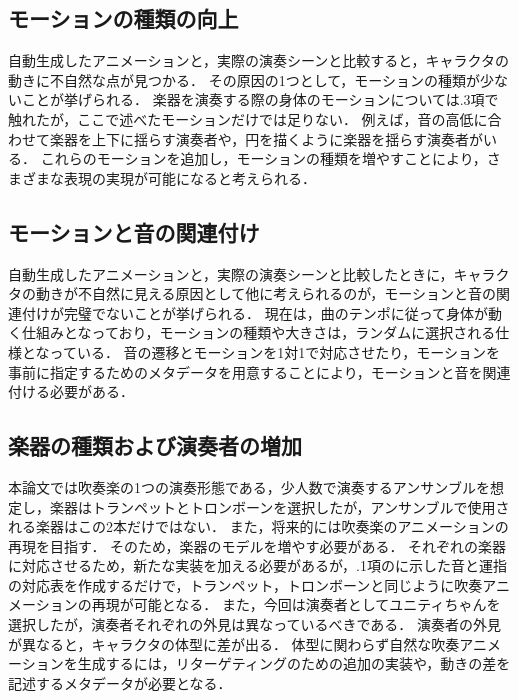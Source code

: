 \subsection{モーションの種類の向上}
自動生成したアニメーションと，実際の演奏シーンと比較すると，キャラクタの動きに不自然な点が見つかる．
その原因の1つとして，モーションの種類が少ないことが挙げられる．
楽器を演奏する際の身体のモーションについては{.3項}で触れたが，ここで述べたモーションだけでは足りない．
例えば，音の高低に合わせて楽器を上下に揺らす演奏者や，円を描くように楽器を揺らす演奏者がいる．
これらのモーションを追加し，モーションの種類を増やすことにより，さまざまな表現の実現が可能になると考えられる．

\subsection{モーションと音の関連付け}
自動生成したアニメーションと，実際の演奏シーンと比較したときに，キャラクタの動きが不自然に見える原因として他に考えられるのが，モーションと音の関連付けが完璧でないことが挙げられる．
現在は，曲のテンポに従って身体が動く仕組みとなっており，モーションの種類や大きさは，ランダムに選択される仕様となっている．
音の遷移とモーションを1対1で対応させたり，モーションを事前に指定するためのメタデータを用意することにより，モーションと音を関連付ける必要がある．

\subsection{楽器の種類および演奏者の増加}
本論文では吹奏楽の1つの演奏形態である，少人数で演奏するアンサンブルを想定し，楽器はトランペットとトロンボーンを選択したが，アンサンブルで使用される楽器はこの2本だけではない．
また，将来的には吹奏楽のアニメーションの再現を目指す．
そのため，楽器のモデルを増やす必要がある．
それぞれの楽器に対応させるため，新たな実装を加える必要があるが，{.1項}のに示した音と運指の対応表を作成するだけで，トランペット，トロンボーンと同じように吹奏アニメーションの再現が可能となる．
また，今回は演奏者としてユニティちゃんを選択したが，演奏者それぞれの外見は異なっているべきである．
演奏者の外見が異なると，キャラクタの体型に差が出る．
体型に関わらず自然な吹奏アニメーションを生成するには，リターゲティングのための追加の実装や，動きの差を記述するメタデータが必要となる．